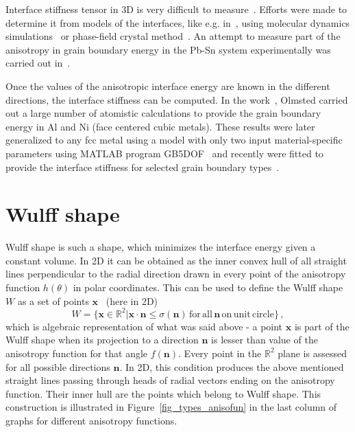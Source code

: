 Interface stiffness tensor in 3D is very difficult to measure~\cite{Du2007}. Efforts were made to determine it from models of the interfaces, like e.g. in~\cite{Du2007}, using molecular dynamics simulations~\cite{Trautt2005,Abdeljawad2018} or phase-field crystal method~\cite{Blixt2022}. An attempt to measure part of the anisotropy in grain boundary energy in the Pb-Sn system experimentally was carried out in~\cite{Rowenhorst2005}. 

Once the values of the anisotropic interface energy are known in the different directions, the interface stiffness can be computed. In the work~\cite{Olmsted2009}, Olmsted carried out a large number of atomistic calculations to provide the grain boundary energy in Al and Ni (face centered cubic metals). These results were later generalized to any fcc metal using a model with only two input material-specific parameters using MATLAB program GB5DOF~\cite{Bulatov2014} and recently were fitted to provide the interface stiffness for selected grain boundary types~\cite{Moore2021}.

\section{Wulff shape} \label{sec_Wulff_shape_intro}
Wulff shape is such a shape, which minimizes the interface energy given a constant volume. In 2D it can be obtained as the inner convex hull of all straight lines perpendicular to the radial direction drawn in every point of the anisotropy function $h(\theta)$ in polar coordinates. This can be used to define the Wulff shape $W$ as a set of points $\bm{x}$~\cite{Kobayashi2001, Eggleston2001, Salvalaglio2015} (here in 2D)
\begin{equation}
    W = \{ \bm{x}\in\mathbb{R}^{2}| \bm{x}\cdot\bm{n}\leq \sigma(\bm{n}) \, \mathrm{for\,all} \, \bm{n} \, \mathrm{on\,unit\,circle}\} \,,
\end{equation}
which is algebraic representation of what was said above - a point $\bm{x}$ is part of the Wulff shape when its projection to a direction $\bm{n}$ is lesser than value of the anisotropy function for that angle $f(\bm{n})$. Every point in the $\mathbb{R}^{2}$ plane is assessed for all possible directions $\bm{n}$. In 2D, this condition produces the above mentioned straight lines passing through heads of radial vectors ending on the anisotropy function. Their inner hull are the points which belong to Wulff shape. This construction is illustrated in Figure~\ref{fig_types_anisofun} in the last column of graphs for different anisotropy functions.

